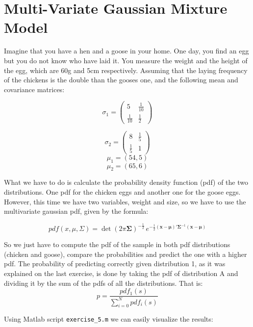 \documentclass[]{article}
\begin{document}
\section{Multi-Variate Gaussian Mixture Model}

Imagine that you have a hen and a goose in your home. One day, you find an egg but you do not know who have laid it. You measure the weight and the height of the egg, which are 60g and 5cm respectively. Assuming that the laying frequency of the chickens is the double than the gooses one, and the following mean and covariance matrices:

\[
\sigma_1 = 
\begin{pmatrix}
5 & \frac{1}{10} \\ 
\frac{1}{10} & \frac{1}{2}
\end{pmatrix} 
\]

\[
\sigma_2 = 
\begin{pmatrix}
8 & \frac{1}{5} \\ 
\frac{1}{5} & 1
\end{pmatrix} 
\]
\[ \mu_1 = (54, 5)\]
\[\mu_2 = (65, 6)\]

What we have to do is calculate the probability density function (pdf)
of the two distributions. One pdf for the chicken eggs and another one
for the goose eggs. However, this time we have two variables, weight and
size, so we have to use the multivariate gaussian pdf, given by the
formula:

\begin{equation}
pdf(x, \mu, \Sigma) = \operatorname{det}(2\pi\boldsymbol\Sigma)^{-\frac{1}{2}} \, e^{ -\frac{1}{2}(\mathbf{x} - \boldsymbol\mu)'\boldsymbol\Sigma^{-1}(\mathbf{x} - \boldsymbol\mu) }
\end{equation}

So we just have to compute the pdf of the sample in both pdf distributions (chicken and goose), compare
the probabilities and predict the one with a higher pdf. The probability
of predicting correctly given distribution 1, as it was explained on the
last exercise, is done by taking the pdf of distribution A and dividing
it by the sum of the pdfs of all the distributions. That is:
\begin{equation}
p = \frac{pdf_1(s)}{\sum_{i = 0}^{N}{pdf_i(s)}}
\end{equation}

Using Matlab script \texttt{exercise\_5.m} we can
easily visualize the results:

\pagebreak
\end{document}
